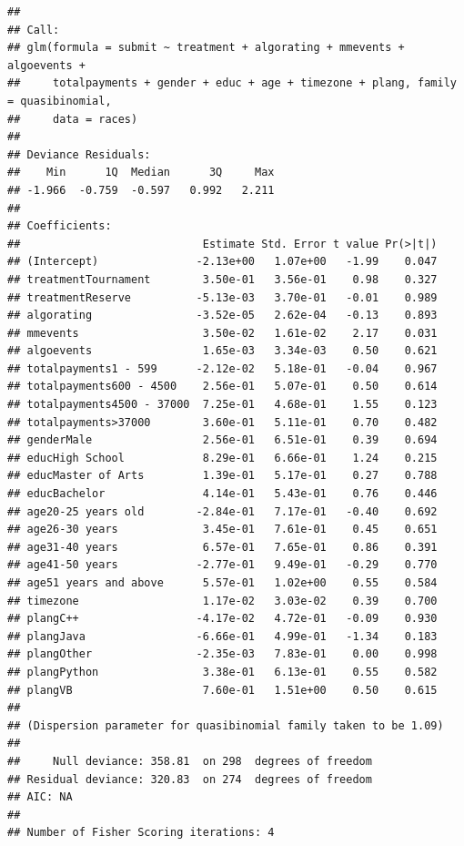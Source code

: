 \documentclass[12pt,]{article}
\begin{document}
\begin{verbatim}
## 
## Call:
## glm(formula = submit ~ treatment + algorating + mmevents + algoevents + 
##     totalpayments + gender + educ + age + timezone + plang, family = quasibinomial, 
##     data = races)
## 
## Deviance Residuals: 
##    Min      1Q  Median      3Q     Max  
## -1.966  -0.759  -0.597   0.992   2.211  
## 
## Coefficients:
##                            Estimate Std. Error t value Pr(>|t|)
## (Intercept)               -2.13e+00   1.07e+00   -1.99    0.047
## treatmentTournament        3.50e-01   3.56e-01    0.98    0.327
## treatmentReserve          -5.13e-03   3.70e-01   -0.01    0.989
## algorating                -3.52e-05   2.62e-04   -0.13    0.893
## mmevents                   3.50e-02   1.61e-02    2.17    0.031
## algoevents                 1.65e-03   3.34e-03    0.50    0.621
## totalpayments1 - 599      -2.12e-02   5.18e-01   -0.04    0.967
## totalpayments600 - 4500    2.56e-01   5.07e-01    0.50    0.614
## totalpayments4500 - 37000  7.25e-01   4.68e-01    1.55    0.123
## totalpayments>37000        3.60e-01   5.11e-01    0.70    0.482
## genderMale                 2.56e-01   6.51e-01    0.39    0.694
## educHigh School            8.29e-01   6.66e-01    1.24    0.215
## educMaster of Arts         1.39e-01   5.17e-01    0.27    0.788
## educBachelor               4.14e-01   5.43e-01    0.76    0.446
## age20-25 years old        -2.84e-01   7.17e-01   -0.40    0.692
## age26-30 years             3.45e-01   7.61e-01    0.45    0.651
## age31-40 years             6.57e-01   7.65e-01    0.86    0.391
## age41-50 years            -2.77e-01   9.49e-01   -0.29    0.770
## age51 years and above      5.57e-01   1.02e+00    0.55    0.584
## timezone                   1.17e-02   3.03e-02    0.39    0.700
## plangC++                  -4.17e-02   4.72e-01   -0.09    0.930
## plangJava                 -6.66e-01   4.99e-01   -1.34    0.183
## plangOther                -2.35e-03   7.83e-01    0.00    0.998
## plangPython                3.38e-01   6.13e-01    0.55    0.582
## plangVB                    7.60e-01   1.51e+00    0.50    0.615
## 
## (Dispersion parameter for quasibinomial family taken to be 1.09)
## 
##     Null deviance: 358.81  on 298  degrees of freedom
## Residual deviance: 320.83  on 274  degrees of freedom
## AIC: NA
## 
## Number of Fisher Scoring iterations: 4
\end{verbatim}
\end{document}
